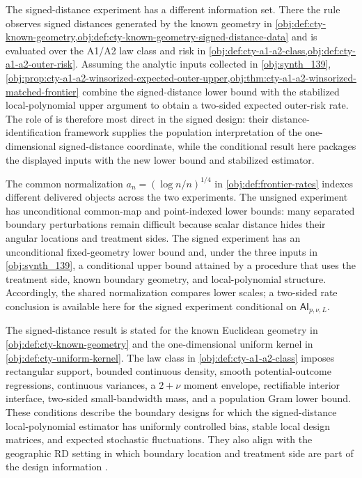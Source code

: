 \documentclass[11pt]{article}
\begin{document}
The signed-distance experiment has a different information set. There the rule observes signed distances generated by the known geometry in \cref{obj:def:cty-known-geometry,obj:def:cty-known-geometry-signed-distance-data} and is evaluated over the A1/A2 law class and risk in \cref{obj:def:cty-a1-a2-class,obj:def:cty-a1-a2-outer-risk}. Assuming the analytic inputs collected in \cref{obj:synth_139}, \cref{obj:prop:cty-a1-a2-winsorized-expected-outer-upper,obj:thm:cty-a1-a2-winsorized-matched-frontier} combine the signed-distance lower bound with the stabilized local-polynomial upper argument to obtain a two-sided expected outer-risk rate. The role of \citet{CattaneoTitiunikYu2026Distance} is therefore most direct in the signed design: their distance-identification framework supplies the population interpretation of the one-dimensional signed-distance coordinate, while the conditional result here packages the displayed inputs with the new lower bound and stabilized estimator.

The common normalization \(a_n=(\log n/n)^{1/4}\) in \cref{obj:def:frontier-rates} indexes different delivered objects across the two experiments. The unsigned experiment has unconditional common-map and point-indexed lower bounds: many separated boundary perturbations remain difficult because scalar distance hides their angular locations and treatment sides. The signed experiment has an unconditional fixed-geometry lower bound and, under the three inputs in \cref{obj:synth_139}, a conditional upper bound attained by a procedure that uses the treatment side, known boundary geometry, and local-polynomial structure. Accordingly, the shared normalization compares lower scales; a two-sided rate conclusion is available here for the signed experiment conditional on \(\mathsf{AI}_{p,\nu,L}\).

The signed-distance result is stated for the known Euclidean geometry in \cref{obj:def:cty-known-geometry} and the one-dimensional uniform kernel in \cref{obj:def:cty-uniform-kernel}. The law class in \cref{obj:def:cty-a1-a2-class} imposes rectangular support, bounded continuous density, smooth potential-outcome regressions, continuous variances, a \(2+\nu\) moment envelope, rectifiable interior interface, two-sided small-bandwidth mass, and a population Gram lower bound. These conditions describe the boundary designs for which the signed-distance local-polynomial estimator has uniformly controlled bias, stable local design matrices, and expected stochastic fluctuations. They also align with the geographic RD setting in which boundary location and treatment side are part of the design information \citep{Keele2015a,Keele2015b,Keele2016,Kendall2026}.
\end{document}
